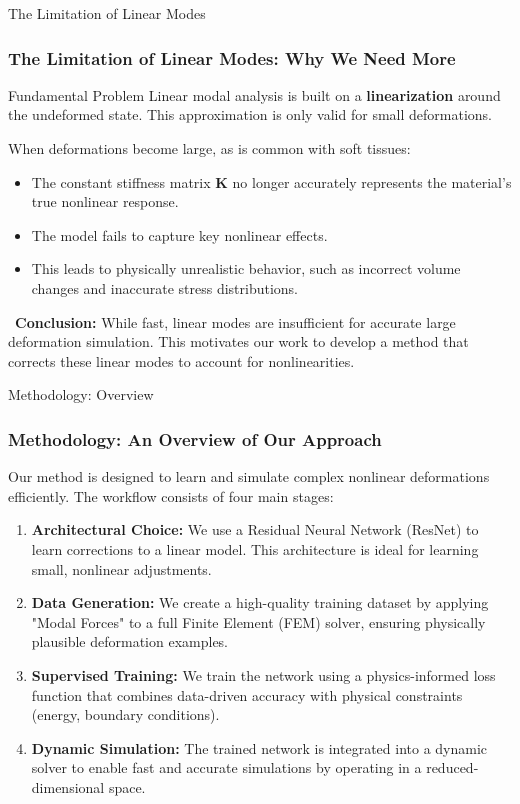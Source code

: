 \documentclass{beamer}
\begin{document}
\begin{frame}{The Limitation of Linear Modes}
    \frametitle{The Limitation of Linear Modes: Why We Need More}
    
    \begin{alertblock}{Fundamental Problem}
        Linear modal analysis is built on a \textbf{linearization} around the undeformed state. This approximation is only valid for small deformations.
    \end{alertblock}
    
    When deformations become large, as is common with soft tissues:
    \begin{itemize}
        \item The constant stiffness matrix \(\bm{K}\) no longer accurately represents the material's true nonlinear response.
        \vspace{1em}
        \item The model fails to capture key nonlinear effects.
        \vspace{1em}
        \item This leads to physically unrealistic behavior, such as incorrect volume changes and inaccurate stress distributions.
    \end{itemize}
    
    \bigskip
    \
    \textbf{Conclusion:} While fast, linear modes are insufficient for accurate large deformation simulation. This motivates our work to develop a method that corrects these linear modes to account for nonlinearities.
\end{frame}

\begin{frame}{Methodology: Overview}
    \frametitle{Methodology: An Overview of Our Approach}
    Our method is designed to learn and simulate complex nonlinear deformations efficiently. The workflow consists of four main stages:
    
    \begin{enumerate}
        \item \textbf{Architectural Choice:} We use a Residual Neural Network (ResNet) to learn corrections to a linear model. This architecture is ideal for learning small, nonlinear adjustments.
        \vspace{1em}
        \item \textbf{Data Generation:} We create a high-quality training dataset by applying "Modal Forces" to a full Finite Element (FEM) solver, ensuring physically plausible deformation examples.
        \vspace{1em}
        \item \textbf{Supervised Training:} We train the network using a physics-informed loss function that combines data-driven accuracy with physical constraints (energy, boundary conditions).
        \vspace{1em}
        \item \textbf{Dynamic Simulation:} The trained network is integrated into a dynamic solver to enable fast and accurate simulations by operating in a reduced-dimensional space.
    \end{enumerate}
\end{frame}
\end{document}

